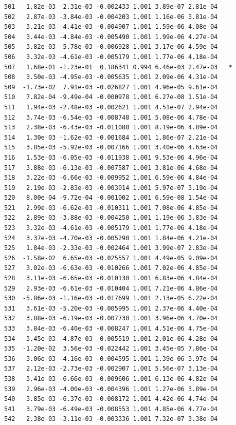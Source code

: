 \documentclass[
  letterpaper,
  DIV=11,
  numbers=noendperiod]{scrartcl}
\begin{document}
\begin{verbatim}
501   1.82e-03 -2.31e-03 -0.002433 1.001 3.89e-07 2.81e-04    
502   2.87e-03 -3.84e-03 -0.004203 1.001 1.16e-06 3.81e-04    
503   3.21e-03 -4.41e-03 -0.004907 1.001 1.59e-06 4.08e-04    
504   3.44e-03 -4.84e-03 -0.005490 1.001 1.99e-06 4.27e-04    
505   3.82e-03 -5.78e-03 -0.006928 1.001 3.17e-06 4.59e-04    
506   3.32e-03 -4.61e-03 -0.005179 1.001 1.77e-06 4.18e-04    
507   1.68e-01 -1.23e-01  0.186341 0.994 6.46e-03 2.47e-03   *
508   3.50e-03 -4.95e-03 -0.005635 1.001 2.09e-06 4.31e-04    
509  -1.73e-02  7.91e-03 -0.026827 1.001 4.96e-05 9.61e-04    
510   7.82e-04 -9.49e-04 -0.000978 1.001 6.27e-08 1.51e-04    
511   1.94e-03 -2.48e-03 -0.002621 1.001 4.51e-07 2.94e-04    
512   3.74e-03 -6.54e-03 -0.008748 1.001 5.08e-06 4.78e-04    
513   2.38e-03 -6.43e-03 -0.011080 1.001 8.19e-06 4.89e-04    
514   1.30e-03 -1.62e-03 -0.001684 1.001 1.86e-07 2.21e-04    
515   3.85e-03 -5.92e-03 -0.007166 1.001 3.40e-06 4.63e-04    
516   1.53e-03 -6.05e-03 -0.011938 1.001 9.53e-06 4.96e-04    
517   3.88e-03 -6.13e-03 -0.007587 1.001 3.81e-06 4.68e-04    
518   3.22e-03 -6.66e-03 -0.009952 1.001 6.59e-06 4.84e-04    
519   2.19e-03 -2.83e-03 -0.003014 1.001 5.97e-07 3.19e-04    
520   8.00e-04 -9.72e-04 -0.001002 1.001 6.59e-08 1.54e-04    
521   2.99e-03 -6.62e-03 -0.010311 1.001 7.08e-06 4.85e-04    
522   2.89e-03 -3.88e-03 -0.004250 1.001 1.19e-06 3.83e-04    
523   3.32e-03 -4.61e-03 -0.005179 1.001 1.77e-06 4.18e-04    
524   3.37e-03 -4.70e-03 -0.005290 1.001 1.84e-06 4.21e-04    
525   1.84e-03 -2.33e-03 -0.002464 1.001 3.99e-07 2.83e-04    
526  -1.58e-02  6.65e-03 -0.025557 1.001 4.49e-05 9.09e-04    
527   3.02e-03 -6.63e-03 -0.010266 1.001 7.02e-06 4.85e-04    
528   3.11e-03 -6.65e-03 -0.010130 1.001 6.83e-06 4.84e-04    
529   2.93e-03 -6.61e-03 -0.010404 1.001 7.21e-06 4.86e-04    
530  -5.86e-03 -1.16e-03 -0.017699 1.001 2.13e-05 6.22e-04    
531   3.61e-03 -5.20e-03 -0.005995 1.001 2.37e-06 4.40e-04    
532   3.88e-03 -6.19e-03 -0.007730 1.001 3.96e-06 4.70e-04    
533   3.84e-03 -6.40e-03 -0.008247 1.001 4.51e-06 4.75e-04    
534   3.45e-03 -4.87e-03 -0.005519 1.001 2.01e-06 4.28e-04    
535  -1.20e-02  3.56e-03 -0.022442 1.001 3.45e-05 7.86e-04    
536   3.06e-03 -4.16e-03 -0.004595 1.001 1.39e-06 3.97e-04    
537   2.12e-03 -2.73e-03 -0.002907 1.001 5.56e-07 3.13e-04    
538   3.41e-03 -6.66e-03 -0.009606 1.001 6.13e-06 4.82e-04    
539   2.96e-03 -4.00e-03 -0.004396 1.001 1.27e-06 3.89e-04    
540   3.85e-03 -6.37e-03 -0.008172 1.001 4.42e-06 4.74e-04    
541   3.79e-03 -6.49e-03 -0.008553 1.001 4.85e-06 4.77e-04    
542   2.38e-03 -3.11e-03 -0.003336 1.001 7.32e-07 3.38e-04    

\end{verbatim}
\end{document}
